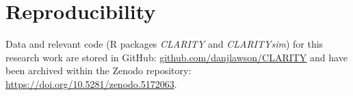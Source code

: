 \documentclass[a4]{article}
\newcommand{\+}[1]{\mathbf{#1}}
\newcommand{\norm}[1]{\|#1\|}
\begin{document}


\section{Reproducibility}

Data and relevant code (R packages \emph{CLARITY} and \emph{CLARITYsim}) for this research work are stored in GitHub: \url{github.com/danjlawson/CLARITY} and have been archived within the Zenodo repository: \url{https://doi.org/10.5281/zenodo.5172063}.

\end{document}
